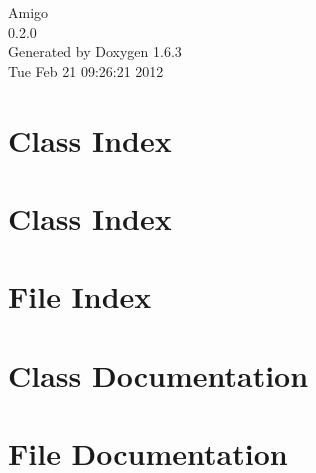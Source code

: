\documentclass[letterpaper]{book}
\begin{document}
\hypersetup{pageanchor=false}
\begin{titlepage}
\vspace*{7cm}
\begin{center}
{\Large Amigo \\[1ex]\large 0.2.0 }\\
\vspace*{1cm}
{\large Generated by Doxygen 1.6.3}\\
\vspace*{0.5cm}
{\small Tue Feb 21 09:26:21 2012}\\
\end{center}
\end{titlepage}
\clearemptydoublepage
{}
\tableofcontents
\clearemptydoublepage
{}
\hypersetup{pageanchor=true}
\chapter{Class Index}

\chapter{Class Index}

\chapter{File Index}

\chapter{Class Documentation}




\chapter{File Documentation}




\printindex
\end{document}

